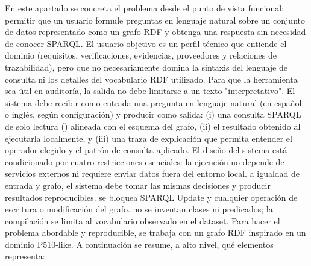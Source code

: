 {}\markdownRendererInterblockSeparator
{}En este apartado se concreta el problema desde el punto de vista funcional: permitir que un usuario formule preguntas en lenguaje natural sobre un conjunto de datos representado como un grafo RDF y obtenga una respuesta sin necesidad de conocer SPARQL. El usuario objetivo es un perfil técnico que entiende el dominio (requisitos, verificaciones, evidencias, proveedores y relaciones de trazabilidad), pero que no necesariamente domina la sintaxis del lenguaje de consulta ni los detalles del vocabulario RDF utilizado.\markdownRendererInterblockSeparator
{}Para que la herramienta sea útil en auditoría, la salida no debe limitarse a un texto "interpretativo". El sistema debe recibir como entrada una pregunta en lenguaje natural (en español o inglés, según configuración) y producir como salida: (i) una consulta SPARQL de solo lectura () alineada con el esquema del grafo, (ii) el resultado obtenido al ejecutarla localmente, y (iii) una traza de explicación que permita entender el operador elegido y el patrón de consulta aplicado.\markdownRendererInterblockSeparator
{}El diseño del sistema está condicionado por cuatro restricciones esenciales:\markdownRendererInterblockSeparator
{}\markdownRendererUlBeginTight
\markdownRendererUlItem {} la ejecución no depende de servicios externos ni requiere enviar datos fuera del entorno local.\markdownRendererUlItemEnd 
\markdownRendererUlItem {} a igualdad de entrada y grafo, el sistema debe tomar las mismas decisiones y producir resultados reproducibles.\markdownRendererUlItemEnd 
\markdownRendererUlItem {} se bloquea SPARQL Update y cualquier operación de escritura o modificación del grafo.\markdownRendererUlItemEnd 
\markdownRendererUlItem {} no se inventan clases ni predicados; la compilación se limita al vocabulario observado en el dataset.\markdownRendererUlItemEnd 
\markdownRendererUlEndTight \markdownRendererInterblockSeparator
{}\markdownRendererInterblockSeparator
{}Para hacer el problema abordable y reproducible, se trabaja con un grafo RDF  inspirado en un dominio P510-like. A continuación se resume, a alto nivel, qué elementos representa:\markdownRendererInterblockSeparator
